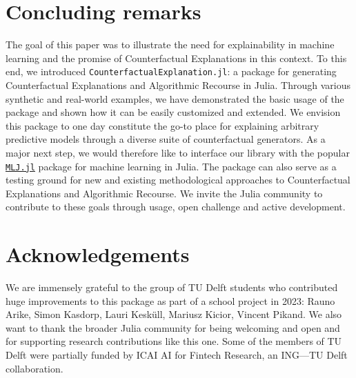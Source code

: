 \documentclass[
  letterpaper,
  DIV=11,
  numbers=noendperiod]{scrartcl}
\begin{document}
\hypertarget{sec-conclude}{%
\section{Concluding remarks}\label{sec-conclude}}

The goal of this paper was to illustrate the need for explainability in
machine learning and the promise of Counterfactual Explanations in this
context. To this end, we introduced
\texttt{CounterfactualExplanation.jl}: a package for generating
Counterfactual Explanations and Algorithmic Recourse in Julia. Through
various synthetic and real-world examples, we have demonstrated the
basic usage of the package and shown how it can be easily customized and
extended. We envision this package to one day constitute the go-to place
for explaining arbitrary predictive models through a diverse suite of
counterfactual generators. As a major next step, we would therefore like
to interface our library with the popular
\href{https://alan-turing-institute.github.io/MLJ.jl/dev/}{\texttt{MLJ.jl}}
package for machine learning in Julia. The package can also serve as a
testing ground for new and existing methodological approaches to
Counterfactual Explanations and Algorithmic Recourse. We invite the
Julia community to contribute to these goals through usage, open
challenge and active development.

\hypertarget{sec-ack}{%
\section{Acknowledgements}\label{sec-ack}}

We are immensely grateful to the group of TU Delft students who
contributed huge improvements to this package as part of a school
project in 2023: Rauno Arike, Simon Kasdorp, Lauri Kesküll, Mariusz
Kicior, Vincent Pikand. We also want to thank the broader Julia
community for being welcoming and open and for supporting research
contributions like this one. Some of the members of TU Delft were
partially funded by ICAI AI for Fintech Research, an ING---TU Delft
collaboration.
\end{document}

